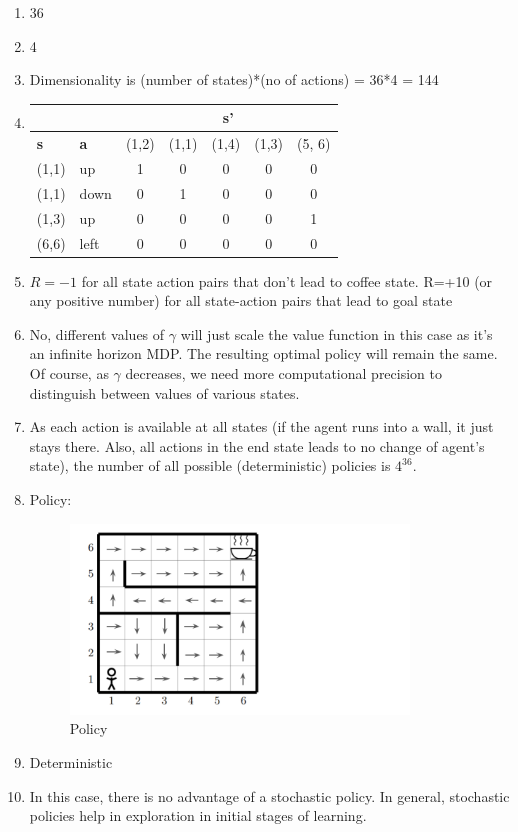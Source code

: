 \documentclass{article}
\begin{document}
\begin{enumerate}[label=(\alph*)]
\item 36
\item 4
\item Dimensionality is (number of states)*(no of actions) = 36*4 = 144
\item  \begin{center}
    \begin{tabular}{|l|l|c|c|c|c|c|}\hline
      \multicolumn{2}{|c|}{} &
                               \multicolumn{5}{|c|}{\textbf{s'}}\\\hline
      \textbf{s} & \textbf{a} & (1,2) & (1,1) & (1,4) & (1,3) & (5, 6)\\\hline
      (1,1) & up & 1 & 0 & 0 & 0 & 0\\ \hline
      (1,1) & down & 0 & 1 & 0 & 0 & 0 \\ \hline
      (1,3) & up & 0 & 0 & 0 & 0  &1 \\ \hline
      (6,6) & left & 0 & 0 & 0 &0 &0\\ \hline
    \end{tabular}
  \end{center}

\item $R=-1$ for all state action pairs that don't lead to coffee state. R=+10 (or any positive number) for all state-action pairs that lead to goal state

\item No, different values of $\gamma$ will just scale the value function in this case as it's an infinite horizon MDP. The resulting optimal policy will remain the same. Of course, as $\gamma$ decreases, we need more computational precision to distinguish between values of various states.

\item As each action is available at all states (if the agent runs into a wall, it just stays there. Also, all actions in the end state leads to no change of agent's state), the number of all possible (deterministic) policies is $4^{36}$.

\item Policy:

\begin{figure}[H]
\centering
\includegraphics[width=90mm]{policy_ann.png}
\caption{Policy \label{overflow}}
\end{figure}
\item Deterministic
\item In this case, there is no advantage of a stochastic policy. In general, stochastic policies help in exploration in initial stages of learning. 
 
\end{enumerate}
\end{document}
